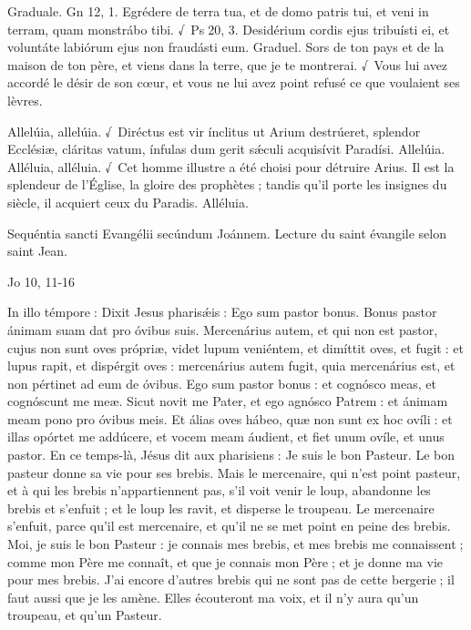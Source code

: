 \begin{paracol}{2}
Graduale. Gn 12, 1. Egrédere de terra tua, et de domo patris tui, et veni in terram, quam monstrábo tibi. √~Ps 20, 3. Desidérium cordis ejus tribuísti ei, et voluntáte labiórum ejus non fraudásti eum.
\switchcolumn
Graduel. Sors de ton pays et de la maison de ton père, et viens dans la terre, que je te montrerai. √~Vous lui avez accordé le désir de son cœur, et vous ne lui avez point refusé ce que voulaient ses lèvres.
\switchcolumn*

Allelúia, allelúia. √~Diréctus est vir ínclitus ut Arium destrúeret, splendor Ecclésiæ, cláritas vatum, ínfulas dum gerit sǽculi acquisívit Paradísi. Allelúia.
\switchcolumn
Alléluia, alléluia. √~Cet homme illustre a été choisi pour détruire Arius. Il est la splendeur de l’Église, la gloire des prophètes ; tandis qu’il porte les insignes du siècle, il acquiert ceux du Paradis. Alléluia.
\switchcolumn*

Sequéntia sancti Evangélii secúndum Joánnem.
\switchcolumn
Lecture du saint évangile selon saint Jean.
\switchcolumn*

Jo 10, 11-16
\switchcolumn

\switchcolumn*

In illo témpore : Dixit Jesus pharisǽis : Ego sum pastor bonus. Bonus pastor ánimam suam dat pro óvibus suis. Mercenárius autem, et qui non est pastor, cujus non sunt oves própriæ, videt lupum veniéntem, et dimíttit oves, et fugit : et lupus rapit, et dispérgit oves : mercenárius autem fugit, quia mercenárius est, et non pértinet ad eum de óvibus. Ego sum pastor bonus : et cognósco meas, et cognóscunt me meæ. Sicut novit me Pater, et ego agnósco Patrem : et ánimam meam pono pro óvibus meis. Et álias oves hábeo, quæ non sunt ex hoc ovíli : et illas opórtet me addúcere, et vocem meam áudient, et fiet unum ovíle, et unus pastor.
\switchcolumn
En ce temps-là, Jésus dit aux pharisiens : Je suis le bon Pasteur. Le bon pasteur donne sa vie pour ses brebis. Mais le mercenaire, qui n’est point pasteur, et à qui les brebis n’appartiennent pas, s’il voit venir le loup, abandonne les brebis et s’enfuit ; et le loup les ravit, et disperse le troupeau. Le mercenaire s’enfuit, parce qu’il est mercenaire, et qu’il ne se met point en peine des brebis. Moi, je suis le bon Pasteur : je connais mes brebis, et mes brebis me connaissent ; comme mon Père me connaît, et que je connais mon Père ; et je donne ma vie pour mes brebis. J’ai encore d’autres brebis qui ne sont pas de cette bergerie ; il faut aussi que je les amène. Elles écouteront ma voix, et il n’y aura qu’un troupeau, et qu’un Pasteur.
\switchcolumn*


\end{paracol}
